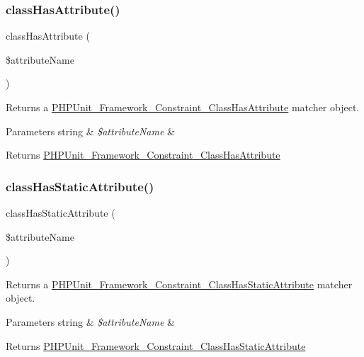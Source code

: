 \subsubsection{\texorpdfstring{class\+Has\+Attribute()}{classHasAttribute()}}
{\footnotesize\ttfamily class\+Has\+Attribute (\begin{DoxyParamCaption}\item[{}]{\$attribute\+Name }\end{DoxyParamCaption})}

Returns a \mbox{\hyperlink{class_p_h_p_unit___framework___constraint___class_has_attribute}{P\+H\+P\+Unit\+\_\+\+Framework\+\_\+\+Constraint\+\_\+\+Class\+Has\+Attribute}} matcher object.


\begin{DoxyParams}[1]{Parameters}
string & {\em \$attribute\+Name} & \\
\hline
\end{DoxyParams}
\begin{DoxyReturn}{Returns}
\mbox{\hyperlink{class_p_h_p_unit___framework___constraint___class_has_attribute}{P\+H\+P\+Unit\+\_\+\+Framework\+\_\+\+Constraint\+\_\+\+Class\+Has\+Attribute}} 
\end{DoxyReturn}
\mbox{\label{_functions_8php_af21679dfcf7a9d56dbd96b660dda9b52}} 
\subsubsection{\texorpdfstring{class\+Has\+Static\+Attribute()}{classHasStaticAttribute()}}
{\footnotesize\ttfamily class\+Has\+Static\+Attribute (\begin{DoxyParamCaption}\item[{}]{\$attribute\+Name }\end{DoxyParamCaption})}

Returns a \mbox{\hyperlink{class_p_h_p_unit___framework___constraint___class_has_static_attribute}{P\+H\+P\+Unit\+\_\+\+Framework\+\_\+\+Constraint\+\_\+\+Class\+Has\+Static\+Attribute}} matcher object.


\begin{DoxyParams}[1]{Parameters}
string & {\em \$attribute\+Name} & \\
\hline
\end{DoxyParams}
\begin{DoxyReturn}{Returns}
\mbox{\hyperlink{class_p_h_p_unit___framework___constraint___class_has_static_attribute}{P\+H\+P\+Unit\+\_\+\+Framework\+\_\+\+Constraint\+\_\+\+Class\+Has\+Static\+Attribute}} 
\end{DoxyReturn}
\mbox{\label{_functions_8php_a9dba79f2c57b5f522b794f8c0e029bec}} 
